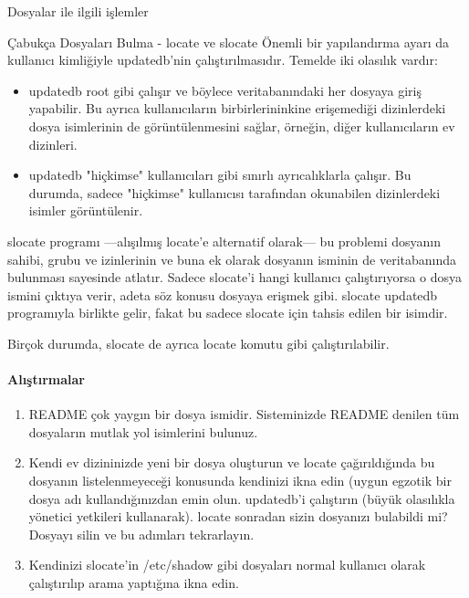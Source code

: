 \begin{section}{Dosyalar ile ilgili işlemler}
\begin{subsection}{Çabukça Dosyaları Bulma - locate ve slocate}
Önemli bir yapılandırma ayarı da kullanıcı kimliğiyle updatedb'nin çalıştırılmasıdır. Temelde iki olasılık vardır:
	\begin{itemize}
	\item updatedb root gibi çalışır ve böylece veritabanındaki her dosyaya giriş yapabilir. Bu ayrıca kullanıcıların birbirlerininkine erişemediği dizinlerdeki dosya isimlerinin de görüntülenmesini sağlar, örneğin, diğer kullanıcıların ev dizinleri.
	\item updatedb "hiçkimse" kullanıcıları gibi sınırlı ayrıcalıklarla çalışır. Bu durumda, sadece "hiçkimse" kullanıcısı tarafından okunabilen dizinlerdeki isimler görüntülenir. 
	\end{itemize}
	
slocate programı —alışılmış locate'e alternatif olarak— bu problemi dosyanın sahibi, grubu ve  izinlerinin ve buna ek olarak dosyanın isminin de veritabanında bulunması sayesinde atlatır. Sadece slocate'i hangi kullanıcı çalıştırıyorsa o dosya ismini çıktıya verir, adeta söz konusu dosyaya erişmek gibi. slocate updatedb programıyla birlikte gelir, fakat bu sadece slocate için tahsis edilen bir isimdir.

Birçok durumda, slocate de ayrıca locate komutu gibi çalıştırılabilir.

\paragraph{{\Huge{\PencilLeftDown}}Alıştırmalar}{
\begin{enumerate}
 \item README çok yaygın bir dosya ismidir. Sisteminizde README denilen tüm dosyaların mutlak yol isimlerini bulunuz.
 \item Kendi ev dizininizde yeni bir dosya oluşturun ve locate çağırıldığında bu dosyanın listelenmeyeceği konusunda kendinizi ikna edin (uygun egzotik bir dosya adı kullandığınızdan emin olun. updatedb'i çalıştırın (büyük olasılıkla yönetici yetkileri kullanarak). locate sonradan sizin dosyanızı bulabildi mi? Dosyayı silin ve bu adımları tekrarlayın.
 \item Kendinizi slocate'in /etc/shadow gibi dosyaları normal kullanıcı olarak çalıştırılıp arama yaptığına ikna edin.
\end{enumerate}}


\end{subsection}
\end{section}
